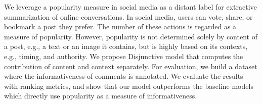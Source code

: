 We leverage a popularity measure in social media as a distant label for extractive summarization of online conversations. In social media, users can vote, share, or bookmark a post they prefer. The number of these actions is regarded as a measure of popularity. However, popularity is not determined solely by content of a post, e.g., a text or an image it contains, but is highly based on its contexts, e.g., timing, and authority. We propose Disjunctive model that computes the contribution of content and context separately. For evaluation, we build a dataset where the informativeness of comments is annotated. We evaluate the results with ranking metrics, and show that our model outperforms the baseline models which directly use popularity as a measure of informativeness.
